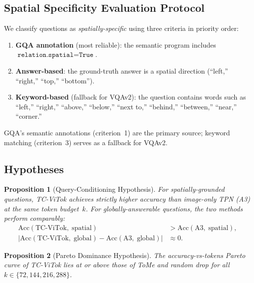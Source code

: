 \documentclass[11pt,a4paper]{article}
\newtheorem{proposition}{Proposition}
\begin{document}
\subsection{Spatial Specificity Evaluation Protocol}
\label{subsec:spatial_protocol}

We classify questions as \emph{spatially-specific} using three criteria in
priority order:
\begin{enumerate}[leftmargin=2em, itemsep=1pt]
  \item \textbf{GQA annotation} (most reliable): the semantic program includes
    $\texttt{relation.spatial}=\texttt{True}$.
  \item \textbf{Answer-based}: the ground-truth answer is a spatial direction
    (``left,'' ``right,'' ``top,'' ``bottom'').
  \item \textbf{Keyword-based} (fallback for VQAv2): the question contains
    words such as ``left,'' ``right,'' ``above,'' ``below,'' ``next to,''
    ``behind,'' ``between,'' ``near,'' ``corner.''
\end{enumerate}
GQA's semantic annotations (criterion~1) are the primary source; keyword
matching (criterion~3) serves as a fallback for VQAv2.

\subsection{Hypotheses}

\begin{proposition}[Query-Conditioning Hypothesis]
  \label{prop:main}
  For spatially-grounded questions, TC-ViTok achieves strictly higher accuracy
  than image-only TPN (A3) at the same token budget~$k$. For
  globally-answerable questions, the two methods perform comparably:
  \begin{align}
    \mathrm{Acc}(\text{TC-ViTok},\;\text{spatial})
      &> \mathrm{Acc}(\text{A3},\;\text{spatial}),
      \label{eq:hyp1} \\[2pt]
    |\mathrm{Acc}(\text{TC-ViTok},\;\text{global})
      - \mathrm{Acc}(\text{A3},\;\text{global})|
      &\approx 0.
      \label{eq:hyp2}
  \end{align}
\end{proposition}

\begin{proposition}[Pareto Dominance Hypothesis]
  \label{prop:pareto}
  The accuracy-vs-tokens Pareto curve of TC-ViTok lies at or above those of
  ToMe and random drop for all $k\in\{72,144,216,288\}$.
\end{proposition}
\end{document}
